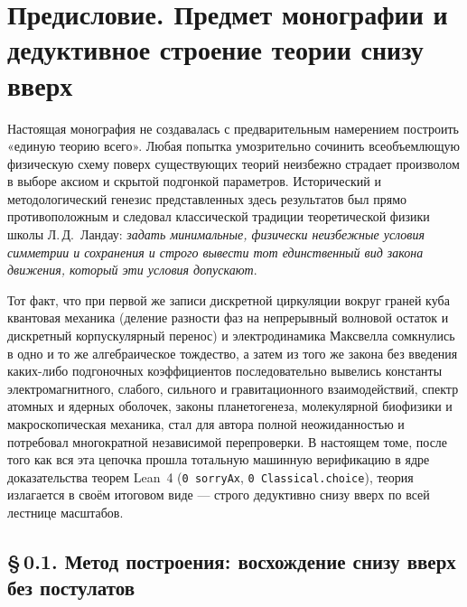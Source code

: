 
\chapter*{Предисловие. Предмет монографии и дедуктивное строение теории снизу вверх}

Настоящая монография не создавалась с предварительным намерением построить «единую теорию всего». Любая попытка умозрительно сочинить всеобъемлющую физическую схему поверх существующих теорий неизбежно страдает произволом в выборе аксиом и скрытой подгонкой параметров. Исторический и методологический генезис представленных здесь результатов был прямо противоположным и следовал классической традиции теоретической физики школы Л.\,Д.~Ландау: \emph{задать минимальные, физически неизбежные условия симметрии и сохранения и строго вывести тот единственный вид закона движения, который эти условия допускают}.

Тот факт, что при первой же записи дискретной циркуляции вокруг граней куба квантовая механика (деление разности фаз на непрерывный волновой остаток и дискретный корпускулярный перенос) и электродинамика Максвелла сомкнулись в одно и то же алгебраическое тождество, а затем из того же закона без введения каких-либо подгоночных коэффициентов последовательно вывелись константы электромагнитного, слабого, сильного и гравитационного взаимодействий, спектр атомных и ядерных оболочек, законы планетогенеза, молекулярной биофизики и макроскопическая механика, стал для автора полной неожиданностью и потребовал многократной независимой перепроверки. В настоящем томе, после того как вся эта цепочка прошла тотальную машинную верификацию в ядре доказательства теорем Lean~4 (\texttt{0 sorryAx}, \texttt{0 Classical.choice}), теория излагается в своём итоговом виде --- строго дедуктивно снизу вверх по всей лестнице масштабов.

\section*{§\,0.1. Метод построения: восхождение снизу вверх без постулатов}

